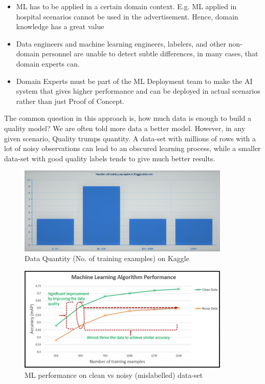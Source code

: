\begin{itemize}
\begin{itemize}
        \item ML has to be applied in a certain domain context. E.g. ML applied in hospital scenarios cannot be used in the advertisement. Hence, domain knowledge has a great value
        \item Data engineers and machine learning engineers, labelers, and other non-domain personnel are unable to detect subtle differences, in many cases, that domain experts can.
        \item Domain Experts must be part of the ML Deployment team to make the AI system that gives higher performance and can be deployed in actual scenarios rather than just Proof of Concept.
    \end{itemize}  
\end{itemize}

The common question in this approach is, how much data is enough to build a quality model? We are often told more data a better model. However, in any given scenario, Quality trumps quantity. A data-set with millions of rows with a lot of noisy observations can lead to an obscured learning process, while a smaller data-set with good quality labels tends to give much better results.

\begin{figure}[h!]
    \centering
    \includegraphics[width=0.9\textwidth]{img/kaggle-dataset.png}
    \caption{Data Quantity (No. of training examples) on Kaggle \cite{patel_data-centric_2021}}
    \label{fig:data-qty-kaggle}
\end{figure}

\begin{figure}[h!]
    \centering
    \includegraphics[width=0.9\textwidth]{img/data-centric-ai-3.jpg}
    \caption{ML performance on clean vs noisy (mislabelled) data-set \cite{patel_data-centric_2021}}
    \label{fig:clean-vs-noisy}
\end{figure}


